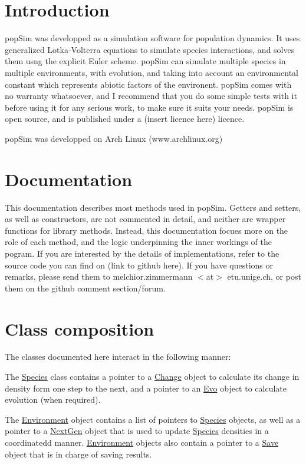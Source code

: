 \hypertarget{index_intro_sec}{}\section{Introduction}\label{index_intro_sec}
pop\+Sim was developped as a simulation software for population dynamics. It uses generalized Lotka-\/\+Volterra equations to simulate species interactions, and solves them usng the explicit Euler scheme. pop\+Sim can simulate multiple species in multiple environments, with evolution, and taking into account an environmental constant which represents abiotic factors of the environent. pop\+Sim comes with no warranty whatsoever, and I recommend that you do some simple tests with it before using it for any serious work, to make sure it suits your needs. pop\+Sim is open source, and is published under a (insert licence here) licence.

pop\+Sim was developped on Arch Linux (www.\+archlinux.\+org)\hypertarget{index_doc_sec}{}\section{Documentation}\label{index_doc_sec}
This documentation describes most methods used in pop\+Sim. Getters and setters, as well as constructors, are not commented in detail, and neither are wrapper functions for library methods. Instead, this documentation focues more on the role of each method, and the logic underpinning the inner workings of the pogram. If you are interested by the details of implementations, refer to the source code you can find on (link to github here). If you have questions or remarks, please send them to melchior.\+zimmermann $<$at$>$ etu.\+unige.\+ch, or post them on the github comment section/forum.\hypertarget{index_doc_compo}{}\section{Class composition}\label{index_doc_compo}
The classes documented here interact in the following manner\+:

The \hyperlink{classSpecies}{Species} class contains a pointer to a \hyperlink{classChange}{Change} object to calculate its change in density form one step to the next, and a pointer to an \hyperlink{classEvo}{Evo} object to calculate evolution (when required).

The \hyperlink{classEnvironment}{Environment} object contains a list of pointers to \hyperlink{classSpecies}{Species} objects, as well as a pointer to a \hyperlink{classNextGen}{Next\+Gen} object that is used to update \hyperlink{classSpecies}{Species} densities in a coordinatedd manner. \hyperlink{classEnvironment}{Environment} objects also contain a pointer to a \hyperlink{classSave}{Save} object that is in charge of saving results.

